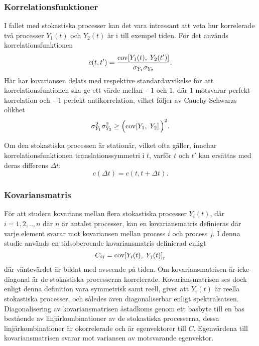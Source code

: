 \subsubsection{Korrelationsfunktioner}
I fallet med stokastiska processer kan det vara intressant att veta
hur korrelerade två processer $Y_1(t)$ och $Y_2(t)$ är i till exempel tiden. För det används
korrelationsfunktionen 
\begin{equation}\label{eq:CORR}
c(t, t') = \frac{\text{cov}\!\left[Y_1(t),\;Y_2(t')\right]}{\sigma_{Y_1}\sigma_{Y_2}}.
\end{equation}
Här har kovariansen delats med respektive standardavvikelse för att
korrelationsfuntionen ska ge ett värde mellan $-1$ och $1$, där $1$ motsvarar perfekt korrelation och $-1$ perfekt antikorrelation, vilket följer av Cauchy-Schwarzs\cite{Engelberg_noise2007} olikhet 
\begin{equation}
\sigma_{Y_1}^2\sigma_{Y_2}^2\geq \Big(\text{cov}\!\left[Y_1,\;Y_2\right]\Big)^2.
\end{equation}

Om den stokastiska processen är stationär, vilket ofta gäller, innehar korrelationsfunktionen
translationssymmetri i $t$, varför $t$ och $t'$ kan ersättas med deras differens $\Delta t$:
\begin{equation}
c(\Delta t) = c(t, t+\Delta t).
\end{equation}

\subsubsection{Kovariansmatris}
För att studera kovarians mellan flera stokastiska processer $Y_i(t)$, där $i=1,2,..,n$ där $n$ är antalet processer, kan en kovariansmatris definieras där varje element svarar mot kovariansen mellan process $i$ och process $j$. I denna studie används en tidsoberoende kovariansmatris definierad enligt 
\begin{equation}
\label{eq:kovmatris}
    C_{ij} = \text{cov}\!\left[Y_i(t),\;Y_j(t)\right]_t
\end{equation}
där väntevärdet är bildat med avseende på tiden. Om kovariansmatrisen är icke-diagonal är de stokastiska processerna korrelerade. Kovariansmatrisen ses dock enligt denna definition vara symmetrisk samt reell, givet att $Y_i(t)$ är reella stokastiska processer, och således även diagonaliserbar enligt spektralsatsen.  Diagonalisering av kovariansmatrisen åstadkoms genom ett basbyte till en bas bestående av linjärkombinationer av de stokastiska processerna, dessa linjärkombinationer är okorrelerade och är egenvektorer\cite{Shlens_PCA2014} till $C$. Egenvärdena till kovariansmatrisen svarar mot variansen av motsvarande egenvektor.

